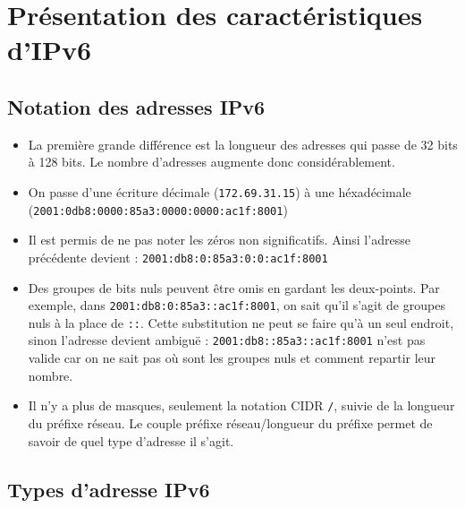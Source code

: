 \section{Présentation des caractéristiques d’IPv6}
\subsection{Notation des adresses IPv6}
  
\begin{itemize}
  \item La première grande différence est la longueur des adresses qui passe de 32 bits à 128 bits. Le nombre d’adresses augmente donc considérablement.
  \item On passe d’une écriture décimale (\texttt{172.69.31.15}) à une héxadécimale (\texttt{2001:0db8:0000:85a3:0000:0000:ac1f:8001})
  \item Il est permis de ne pas noter les zéros non significatifs. Ainsi l'adresse précédente devient : \texttt{2001:db8:0:85a3:0:0:ac1f:8001}
  \item Des groupes de bits nuls peuvent être omis en gardant les deux-points. Par exemple, dans \texttt{2001:db8:0:85a3::ac1f:8001}, on sait qu'il s’agit de groupes nuls à la place de \texttt{::}. Cette substitution ne peut se faire qu’à un seul endroit, sinon l’adresse devient ambiguë : \texttt{2001:db8::85a3::ac1f:8001} n'est pas valide car on ne sait pas où sont les groupes nuls et comment repartir leur nombre.
  \item Il n’y a plus de masques, seulement la notation CIDR \texttt{/}, suivie de la longueur du préfixe réseau. Le couple préfixe réseau/longueur du préfixe permet de savoir de quel type d’adresse il s’agit.
\end{itemize}

\subsection{Types d’adresse IPv6}

